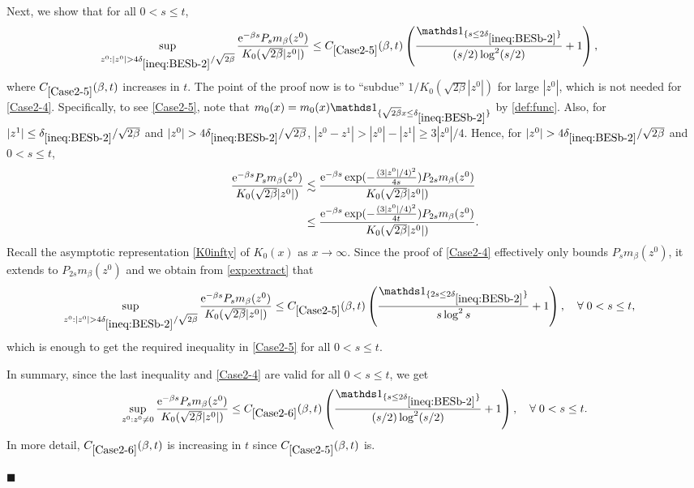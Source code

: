 \documentclass[12pt, twoside]{article}
\numberwithin{figure}{section}
\newcommand{\less}{\lesssim}
\newcommand{\e}{{\mathrm e}}
\newcommand{\1}{\mathds 1}
\newcommand{\2}{{\mathbf 1}}
\renewenvironment{proof}[1][\proofname]{\noindent {\bfseries #1.}\;}{\hfill\ensuremath{\blacksquare}\\}
\newcommand{\cc}{{^\circ}}
\newcommand{\deltaz}{\delta_{\ref{ineq:BESb-2}}}
\begin{document}
\begin{proof}[Proof of Proposition~\ref{prop:BESmom} (1$\cc$)]
Next, we show that for all $0<s\leq t$,
\begin{align}\label{Case2-5}
\sup_{z^0:|z^0|>4\deltaz/\sqrt{2\beta}}\frac{\e^{-\beta s}P_{s}m_{\beta}(z^0)}{K_0(\sqrt{2\beta}|z^0|)}
&\leq C_{\ref{Case2-5}}(\beta,t)\left( \frac{\1_{\{s\leq 2\deltaz \}}}{(s/2)\log^2(s/2)}+1\right),
\end{align}
where $C_{\ref{Case2-5}}(\beta,t)$ increases in $t$.
The point of the proof now is to ``subdue'' $1/K_0(\sqrt{2\beta}|z^0|)$ for large $|z^0|$, which is not needed for \eqref{Case2-4}.
Specifically,
to see \eqref{Case2-5}, note that $m_0(x)=m_0(x)\1_{\{\sqrt{2\beta}x\leq \deltaz\}}$ by \eqref{def:func}. Also, for $|z^1|\leq \deltaz/\sqrt{2\beta}$ and
$|z^0|>4 \deltaz/\sqrt{2\beta}$, $|z^0-z^1|>|z^0|-|z^1|\geq 3|z^0|/4$. Hence, for $|z^0|>4 \deltaz/\sqrt{2\beta}$ and $0<s\leq t$,
\begin{align}
\frac{\e^{-\beta s}P_{s}m_{\beta}(z^0)}{K_0(\sqrt{2\beta}|z^0|)}&\less \frac{\e^{-\beta s}\exp(-\frac{(3|z^0|/4)^2}{4s})P_{2s}m_{\beta}(z^0)
}{K_0(\sqrt{2\beta}|z^0|)}\notag\\
&\leq  \frac{\e^{-\beta s}\exp(-\frac{(3|z^0|/4)^2}{4t})P_{2s}m_{\beta}(z^0)
}{K_0(\sqrt{2\beta}|z^0|)}.\label{exp:extract}
\end{align}
Recall the asymptotic representation \eqref{K0infty} of $K_0(x)$ as $x\to\infty$.
Since the proof of \eqref{Case2-4} effectively only bounds $P_sm_\beta(z^0)$, it extends to $P_{2s}m_\beta(z^0)$ and 
 we obtain from \eqref{exp:extract} that
\begin{align*}
\sup_{z^0:|z^0|>4\deltaz/\sqrt{2\beta}}\frac{\e^{-\beta s}P_{s}m_{\beta}(z^0)}{K_0(\sqrt{2\beta}|z^0|)}&\leq C_{\ref{Case2-5}}(\beta,t)\left( \frac{\1_{\{2s\leq 2\deltaz \}}}{s\log^2s}+1\right),\quad\forall\;0<s\leq t,
\end{align*}
which is enough to get the required inequality in \eqref{Case2-5} for all $0<s\leq t$. 

In summary, since the last inequality and \eqref{Case2-4} are valid for all $0<s\leq t$, we get
\begin{align}\label{Case2-6}
\sup_{z^0:z^0\neq 0}\frac{\e^{-\beta s}P_{s} m_{\beta}(z^0)}{K_0(\sqrt{2\beta}|z^0|)}\leq C_{\ref{Case2-6}}(\beta,t) \left( \frac{\1_{\{s\leq 2\deltaz \}}}{(s/2)\log^2(s/2)}+1\right), \quad\forall\;0<s\leq t.
\end{align}
In more detail, $C_{\ref{Case2-6}}(\beta,t)$ is increasing in $t$ since $C_{\ref{Case2-5}}(\beta,t)$ is.\smallskip 


\end{proof}
\end{document}
